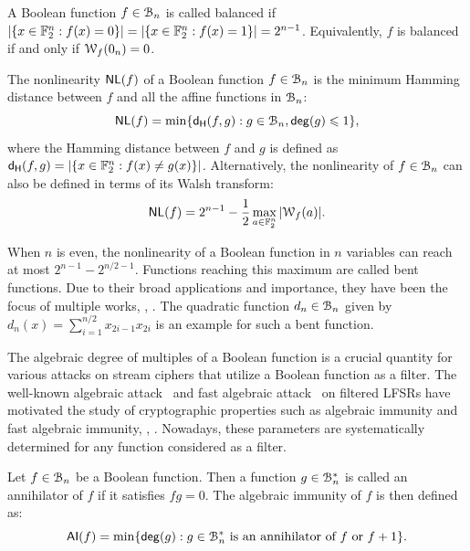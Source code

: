 \documentclass[11pt]{llncs}
\begin{document}
\begin{definition}[Balancedness]
A Boolean function $f\in\mathcal{B}_n$ is called balanced if $|\{x \in \mathbb{F}_2^n : f(x)=0\}|=|\{x \in \mathbb{F}_2^n : f(x)=1\}|=2^{n-1}$. 
Equivalently, $f$ is balanced if and only if $\mathcal W_{f}(0_n)=0$.
\end{definition}

\begin{definition}%
	\label{def:nl}
	The nonlinearity $\mathsf{NL}(f)$ of a Boolean function $f\in \mathcal{B}_n$ is the minimum Hamming distance between $f$ and all the affine functions in $\mathcal{B}_n$:
	\[
		\mathsf{NL}(f) = \min\{ \mathsf{d_H}(f,g):g\in\mathcal{B}_n,\mathsf{deg}(g)\leqslant 1\},
	\]
	where the Hamming distance between $f$ and $g$ is defined as $\mathsf{d_H}(f,g)=|\{x\in\mathbb{F}_2^n:f(x)\neq g(x)\}|$. Alternatively, the nonlinearity of $f\in\mathcal{B}_n$ can also be defined in terms of its Walsh transform:
	\[
		\mathsf{NL}(f) = 2^{n-1}- \frac{1}{2} \max_{a\in \mathbb{F}_2^n}{|\mathcal W_{f}(a)|}.
	\]
\end{definition}

When $n$ is even, the nonlinearity of a Boolean function in $n$ variables can reach at most $2^{n-1}-2^{n/2 -1}$. Functions reaching this maximum are called bent functions. Due to their broad applications and importance, they have been the focus of multiple works, \eg, \cite{Rothaus76,FSE:Dobbertin95,DBLP:conf/itw/BudaghyanCH11,Tokareva15,Mesnager16}. 
The quadratic function $d_n\in\mathcal{B}_n$ given by $d_n(x)=\sum_{i=1}^{n/2}x_{2i-1}x_{2i}$ is an example for such a bent function.

\bigskip

The algebraic degree of multiples of a Boolean function is a crucial quantity for various attacks on stream ciphers that utilize a Boolean function as a filter. 
The well-known algebraic attack~\cite{EC:CouMei03} and fast algebraic attack~\cite{C:Courtois03} on filtered \textsf{LFSR}s have motivated the study of cryptographic properties such as algebraic immunity and fast algebraic immunity, \eg, \cite{FSE:Armknecht04,C:HawRos04,ISC:JiaZhaWan13}. Nowadays, these parameters are systematically determined for any function considered as a filter.

\begin{definition} \label{def:ai}
	Let $f\in\mathcal{B}_n$ be a Boolean function. Then a function $g\in\mathcal{B}_n^*$ is called an annihilator of $f$ if it satisfies $fg=0$. The algebraic immunity of $f$ is then defined as:
	\[ \mathsf{AI}(f) = \min\{ \mathsf{deg}(g):\text{$g\in\mathcal{B}_n^*$ is an annihilator of $f$ or $f+1$}\}.\]
\end{definition}
\end{document}

